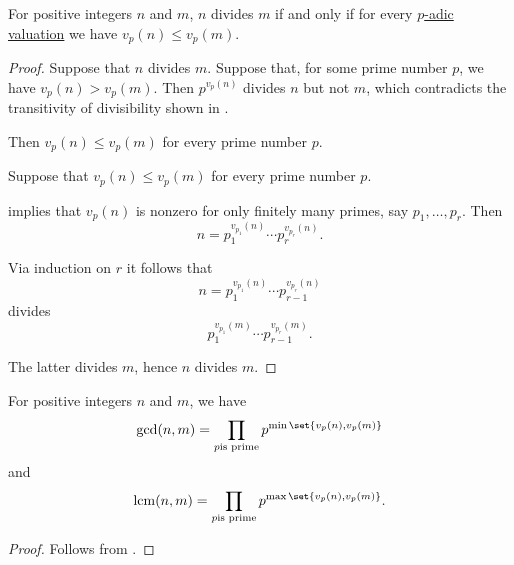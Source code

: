 \begin{corollary}\label{thm:integer_divisibility_via_primes}
  For positive integers \( n \) and \( m \), \( n \) divides \( m \) if and only if for every \hyperref[def:padic_valuation]{\( p \)-adic valuation} we have \( v_p(n) \leq v_p(m) \).
\end{corollary}
\begin{proof}
  \SufficiencySubProof Suppose that \( n \) divides \( m \). Suppose that, for some prime number \( p \), we have \( v_p(n) > v_p(m) \). Then \( p^{v_p(n)} \) divides \( n \) but not \( m \), which contradicts the transitivity of divisibility shown in .

  Then \( v_p(n) \leq v_p(m) \) for every prime number \( p \).

  \NecessitySubProof Suppose that \( v_p(n) \leq v_p(m) \) for every prime number \( p \).

   implies that \( v_p(n) \) is nonzero for only finitely many primes, say \( p_1, \ldots, p_r \). Then
  \begin{equation}\label{eq:thm:integer_divisibility_via_primes/proof/decomposition}
    n = p_1^{v_{p_1}(n)} \cdots p_r^{v_{p_r}(n)}.
  \end{equation}

  Via induction on \( r \) it follows that
  \begin{equation*}
    n = p_1^{v_{p_1}(n)} \cdots p_{r-1}^{v_{p_r}(n)}
  \end{equation*}
  divides
  \begin{equation*}
    p_1^{v_{p_1}(m)} \cdots p_{r-1}^{v_{p_r}(m)}.
  \end{equation*}

  The latter divides \( m \), hence \( n \) divides \( m \).
\end{proof}

\begin{corollary}\label{thm:integer_gcd_lcm_via_primes}
  For positive integers \( n \) and \( m \), we have
  \begin{equation*}
    \gcd(n, m) = \prod_{p \T{is prime}} p^{\min\set{ v_p(n), v_p(m) }}
  \end{equation*}
  and
  \begin{equation*}
    \lcm(n, m) = \prod_{p \T{is prime}} p^{\max\set{ v_p(n), v_p(m) }}.
  \end{equation*}
\end{corollary}
\begin{proof}
  Follows from .
\end{proof}

